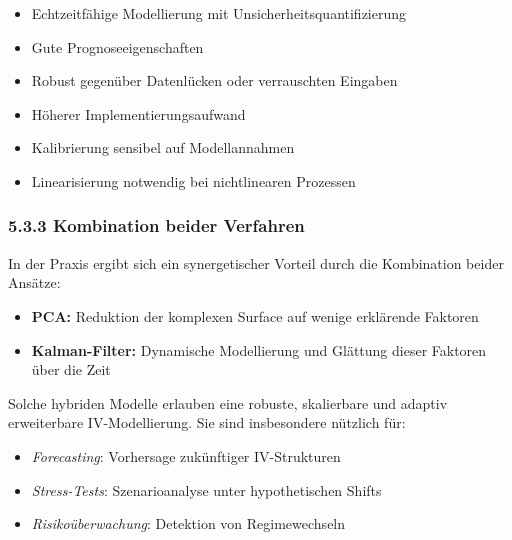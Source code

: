 \documentclass[a4paper,12pt]{article}
\begin{document}
\noindent
\begin{minipage}[t]{0.48\textwidth}
\begin{tcolorbox}[colback=blue!5!white, colframe=blue!75!black, title=Vorteile]
\begin{itemize}
  \item Echtzeitfähige Modellierung mit Unsicherheitsquantifizierung
  \item Gute Prognoseeigenschaften
  \item Robust gegenüber Datenlücken oder verrauschten Eingaben
\end{itemize}
\end{tcolorbox}
\end{minipage}
\hfill
\begin{minipage}[t]{0.48\textwidth}
\begin{tcolorbox}[colback=red!5!white, colframe=red!75!black, title=Grenzen]
\begin{itemize}
  \item Höherer Implementierungsaufwand
  \item Kalibrierung sensibel auf Modellannahmen
  \item Linearisierung notwendig bei nichtlinearen Prozessen
\end{itemize}
\end{tcolorbox}
\end{minipage}

\subsubsection*{5.3.3 Kombination beider Verfahren}

In der Praxis ergibt sich ein synergetischer Vorteil durch die Kombination beider Ansätze:

\begin{itemize}
  \item \textbf{PCA:} Reduktion der komplexen Surface auf wenige erklärende Faktoren
  \item \textbf{Kalman-Filter:} Dynamische Modellierung und Glättung dieser Faktoren über die Zeit
\end{itemize}

Solche hybriden Modelle erlauben eine robuste, skalierbare und adaptiv erweiterbare IV-Modellierung. Sie sind insbesondere nützlich für:
\begin{itemize}
  \item \textit{Forecasting}: Vorhersage zukünftiger IV-Strukturen
  \item \textit{Stress-Tests}: Szenarioanalyse unter hypothetischen Shifts
  \item \textit{Risikoüberwachung}: Detektion von Regimewechseln
\end{itemize}
\clearpage
\end{document}
